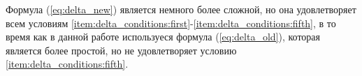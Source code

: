 Формула (\ref{eq:delta_new}) является немного более сложной, но она удовлетворяет всем условиям 
\ref{item:delta_conditions:first}-\ref{item:delta_conditions:fifth}, в то время как в данной работе
используеся формула (\ref{eq:delta_old}), которая является более простой, но не удовлетворяет условию \ref{item:delta_conditions:fifth}.




